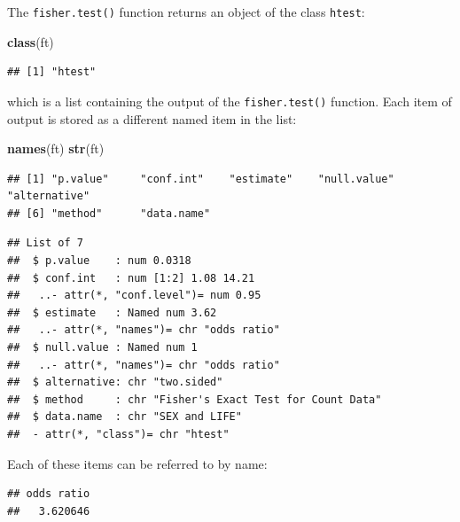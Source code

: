 \documentclass[12pt,a4paper]{book}
\newenvironment{Shaded}{\begin{snugshade}}{\end{snugshade}}
\newcommand{\KeywordTok}[1]{\textcolor[rgb]{0.13,0.29,0.53}{\textbf{#1}}}
\newcommand{\OperatorTok}[1]{\textcolor[rgb]{0.81,0.36,0.00}{\textbf{#1}}}
\newcommand{\NormalTok}[1]{#1}
\theoremstyle{definition}
\theoremstyle{definition}
\theoremstyle{definition}
\theoremstyle{remark}
\begin{document}
The \texttt{fisher.test()} function returns an object of the class
\texttt{htest}:

\begin{Shaded}
\begin{Highlighting}[]
\KeywordTok{class}\NormalTok{(ft)}
\end{Highlighting}
\end{Shaded}

\begin{verbatim}
## [1] "htest"
\end{verbatim}

which is a list containing the output of the \texttt{fisher.test()}
function. Each item of output is stored as a different named item in the
list:

\begin{Shaded}
\begin{Highlighting}[]
\KeywordTok{names}\NormalTok{(ft)}
\KeywordTok{str}\NormalTok{(ft)}
\end{Highlighting}
\end{Shaded}

\begin{verbatim}
## [1] "p.value"     "conf.int"    "estimate"    "null.value"  "alternative"
## [6] "method"      "data.name"
\end{verbatim}

\begin{verbatim}
## List of 7
##  $ p.value    : num 0.0318
##  $ conf.int   : num [1:2] 1.08 14.21
##   ..- attr(*, "conf.level")= num 0.95
##  $ estimate   : Named num 3.62
##   ..- attr(*, "names")= chr "odds ratio"
##  $ null.value : Named num 1
##   ..- attr(*, "names")= chr "odds ratio"
##  $ alternative: chr "two.sided"
##  $ method     : chr "Fisher's Exact Test for Count Data"
##  $ data.name  : chr "SEX and LIFE"
##  - attr(*, "class")= chr "htest"
\end{verbatim}

Each of these items can be referred to by name:

\begin{Shaded}
\end{Shaded}

\begin{verbatim}
## odds ratio 
##   3.620646
\end{verbatim}
\end{document}
